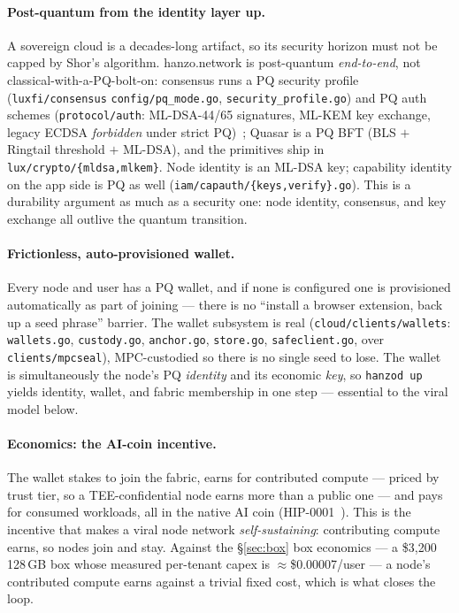 \documentclass[11pt]{article}
\begin{document}
\paragraph{Post-quantum from the identity layer up.} A sovereign cloud is a decades-long artifact,
so its security horizon must not be capped by Shor's algorithm. hanzo.network is post-quantum
\emph{end-to-end}, not classical-with-a-PQ-bolt-on: consensus runs a PQ security profile
(\texttt{luxfi/consensus} \texttt{config/pq\_mode.go}, \texttt{security\_profile.go}) and PQ auth
schemes (\texttt{protocol/auth}: ML-DSA-44/65 signatures, ML-KEM key exchange, legacy ECDSA
\emph{forbidden} under strict PQ)~\cite{hip0005}; Quasar is a PQ BFT (BLS $+$ Ringtail threshold
$+$ ML-DSA), and the primitives ship in \texttt{lux/crypto/\{mldsa,mlkem\}}. Node identity is an
ML-DSA key; capability identity on the app side is PQ as well (\texttt{iam/capauth/\{keys,verify\}.go}).
This is a durability argument as much as a security one: node identity, consensus, and key
exchange all outlive the quantum transition.

\paragraph{Frictionless, auto-provisioned wallet.} Every node and user has a PQ wallet, and if
none is configured one is provisioned automatically as part of joining --- there is no ``install a
browser extension, back up a seed phrase'' barrier. The wallet subsystem is real
(\texttt{cloud/clients/wallets}: \texttt{wallets.go}, \texttt{custody.go}, \texttt{anchor.go},
\texttt{store.go}, \texttt{safeclient.go}, over \texttt{clients/mpcseal}), MPC-custodied so there
is no single seed to lose. The wallet is simultaneously the node's PQ \emph{identity} and its
economic \emph{key}, so \texttt{hanzod up} yields identity, wallet, and fabric membership in one
step --- essential to the viral model below.

\paragraph{Economics: the AI-coin incentive.} The wallet stakes to join the fabric, earns for
contributed compute --- priced by trust tier, so a TEE-confidential node earns more than a public
one --- and pays for consumed workloads, all in the native AI coin (HIP-0001~\cite{hip0001}). This
is the incentive that makes a viral node network \emph{self-sustaining}: contributing compute
earns, so nodes join and stay. Against the \S\ref{sec:box} box economics --- a \$3{,}200 128\,GB
box whose measured per-tenant capex is $\approx$\$0.00007/user --- a node's contributed compute
earns against a trivial fixed cost, which is what closes the loop.
\end{document}
